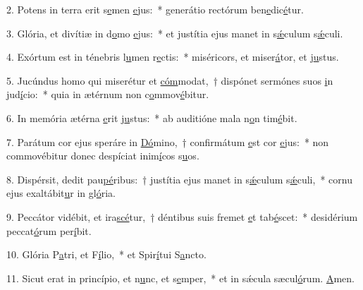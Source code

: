 2. Potens in terra erit s\uline{e}men \uline{e}jus:~* generátio rectórum ben\uline{e}dic\uline{é}tur.\par 
3. Glória, et divítiæ in d\uline{o}mo \uline{e}jus:~* et justítia ejus manet in s\uline{ǽ}culum s\uline{ǽ}culi.\par 
4. Exórtum est in ténebris l\uline{u}men r\uline{e}ctis:~* miséricors, et miser\uline{á}tor, et j\uline{u}stus.\par 
5. Jucúndus homo qui miserétur et \uline{cóm}modat,~† dispónet sermónes suos \uline{i}n jud\uline{í}cio:~* quia in ætérnum non c\uline{o}mmov\uline{é}bitur.\par 
6. In memória ætérna \uline{e}rit j\uline{u}stus:~* ab auditióne mala n\uline{o}n tim\uline{é}bit.\par 
7. Parátum cor ejus speráre in \uline{Dó}mino,~† confirmátum \uline{e}st cor \uline{e}jus:~* non commovébitur donec despíciat inim\uline{í}cos s\uline{u}os.\par 
8. Dispérsit, dedit pau\uline{pé}ribus:~† justítia ejus manet in s\uline{ǽ}culum s\uline{ǽ}culi,~* cornu ejus exaltábit\uline{u}r in gl\uline{ó}ria.\par 
9. Peccátor vidébit, et ira\uline{scé}tur,~† déntibus suis fremet \uline{e}t tab\uline{é}scet:~* desidérium peccat\uline{ó}rum per\uline{í}bit.\par 
10. Glória P\uline{a}tri, et F\uline{í}lio,~* et Spir\uline{í}tui S\uline{a}ncto.\par 
11. Sicut erat in princípio, et n\uline{u}nc, et s\uline{e}mper,~* et in sǽcula sæcul\uline{ó}rum. \uline{A}men.\par 
